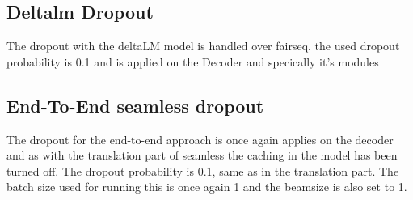 \subsection{Deltalm Dropout}
The dropout with the deltaLM model is handled over fairseq. 
the used dropout probability is 0.1 and is applied on the Decoder and specically it's modules



\subsection{End-To-End seamless dropout}
The dropout for the end-to-end approach is once again applies on the decoder and as with the translation part of seamless the caching in the model has been turned off. The dropout probability is 0.1, same as in the translation part. The batch size used for running this is once again 1 and the beamsize is also set to 1. 



